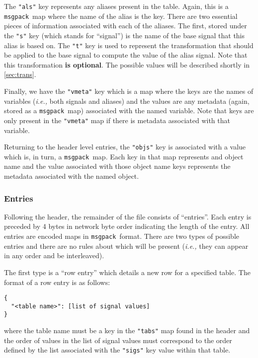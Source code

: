 \documentclass[11pt,a4paper,twocolumn]{article}
\newcommand{\msgpack}{\texttt{msgpack}}
\newcommand{\code}[1]{\texttt{#1}} %
\begin{document}
The \code{"als"} key represents any aliases present in the table.
Again, this is a \msgpack\ map where the name of the alias is the key.
There are two essential pieces of information associated with each of
the aliases.  The first, stored under the \code{"s"} key (which stands
for ``signal'') is the name of the base signal that this alias is
based on.  The \code{"t"} key is used to represent the transformation
that should be applied to the base signal to compute the value of the
alias signal.  Note that this transformation \textbf{is optional}.
The possible values will be described shortly in \ref{sec:trans}.

Finally, we have the \code{"vmeta"} key which is a map where the keys
are the names of variables (\textit{i.e.,} both signals and aliases) and
the values are any metadata (again, stored as a \msgpack\ map)
associated with the named variable.  Note that keys are only present
in the \code{"vmeta"} map if there is metadata associated with that
variable.

Returning to the header level entries, the \code{"objs"} key is
associated with a value which is, in turn, a \msgpack\ map.  Each key
in that map represents and object name and the value associated with
those object name keys represents the metadata associated with the
named object.

\subsubsection{Entries}

Following the header, the remainder of the file consists of
``entries''.  Each entry is preceded by 4 bytes in network byte order
indicating the length of the entry.  All entries are encoded maps in
\msgpack\ format.  There are two types of possible entries and there
are no rules about which will be present (\textit{i.e.,} they can appear
in any order and be interleaved).

The first type is a ``row entry'' which details a new row for a
specified table.  The format of a row entry is as follows:

\begin{verbatim}
{
  "<table name>": [list of signal values]
}
\end{verbatim}

where the table name must be a key in the \code{"tabs"} map found in
the header and the order of values in the list of signal values must
correspond to the order defined by the list associated with the
\code{"sigs"} key value within that table.
\end{document}
